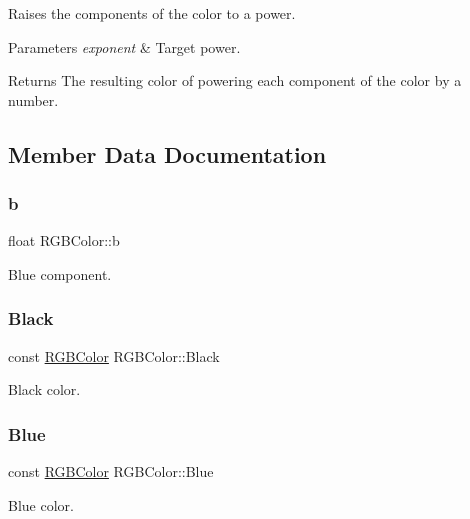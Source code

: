 Raises the components of the color to a power. 
\begin{DoxyParams}{Parameters}
{\em exponent} & Target power. \\
\hline
\end{DoxyParams}
\begin{DoxyReturn}{Returns}
The resulting color of powering each component of the color by a number. 
\end{DoxyReturn}


\subsection{Member Data Documentation}
\hypertarget{class_r_g_b_color_adec4491768d446770055a6b23f18927d}{}\label{class_r_g_b_color_adec4491768d446770055a6b23f18927d} 
\subsubsection{\texorpdfstring{b}{b}}
{\footnotesize\ttfamily float R\+G\+B\+Color\+::b}

Blue component. \hypertarget{class_r_g_b_color_a72f06dff766cb98998ef01f7018e1218}{}\label{class_r_g_b_color_a72f06dff766cb98998ef01f7018e1218} 
\subsubsection{\texorpdfstring{Black}{Black}}
{\footnotesize\ttfamily const \hyperlink{class_r_g_b_color}{R\+G\+B\+Color} R\+G\+B\+Color\+::\+Black\hspace{0.3cm}{\ttfamily [static]}}

Black color. \hypertarget{class_r_g_b_color_a65d9d43015d92b2aab0d850bb73534db}{}\label{class_r_g_b_color_a65d9d43015d92b2aab0d850bb73534db} 
\subsubsection{\texorpdfstring{Blue}{Blue}}
{\footnotesize\ttfamily const \hyperlink{class_r_g_b_color}{R\+G\+B\+Color} R\+G\+B\+Color\+::\+Blue\hspace{0.3cm}{\ttfamily [static]}}

Blue color. \hypertarget{class_r_g_b_color_a744b090c52455e09a4eacf55cabc39f9}{}\label{class_r_g_b_color_a744b090c52455e09a4eacf55cabc39f9} 
